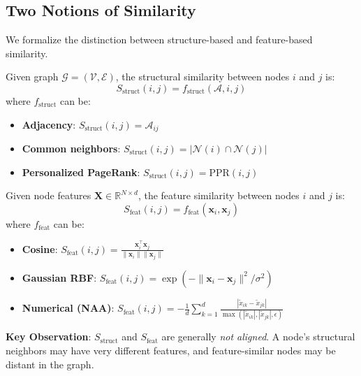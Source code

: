 \subsection{Two Notions of Similarity}

We formalize the distinction between structure-based and feature-based similarity.

\begin{definition}
\label{def:struct_sim}
Given graph $\mathcal{G} = (\mathcal{V}, \mathcal{E})$, the structural similarity between nodes $i$ and $j$ is:
\begin{equation}
S_{\text{struct}}(i, j) = f_{\text{struct}}(\mathcal{A}, i, j)
\end{equation}
where $f_{\text{struct}}$ can be:
\begin{itemize}
    \item \textbf{Adjacency}: $S_{\text{struct}}(i,j) = \mathcal{A}_{ij}$
    \item \textbf{Common neighbors}: $S_{\text{struct}}(i,j) = |\mathcal{N}(i) \cap \mathcal{N}(j)|$
    \item \textbf{Personalized PageRank}: $S_{\text{struct}}(i,j) = \text{PPR}(i,j)$
\end{itemize}
\end{definition}

\begin{definition}
\label{def:feat_sim}
Given node features $\mathbf{X} \in \mathbb{R}^{N \times d}$, the feature similarity between nodes $i$ and $j$ is:
\begin{equation}
S_{\text{feat}}(i, j) = f_{\text{feat}}(\mathbf{x}_i, \mathbf{x}_j)
\end{equation}
where $f_{\text{feat}}$ can be:
\begin{itemize}
    \item \textbf{Cosine}: $S_{\text{feat}}(i,j) = \frac{\mathbf{x}_i^\top \mathbf{x}_j}{\|\mathbf{x}_i\| \|\mathbf{x}_j\|}$
    \item \textbf{Gaussian RBF}: $S_{\text{feat}}(i,j) = \exp(-\|\mathbf{x}_i - \mathbf{x}_j\|^2 / \sigma^2)$
    \item \textbf{Numerical (NAA)}: $S_{\text{feat}}(i,j) = -\frac{1}{d}\sum_{k=1}^{d} \frac{|\tilde{x}_{ik} - \tilde{x}_{jk}|}{\max(|\tilde{x}_{ik}|, |\tilde{x}_{jk}|, \epsilon)}$
\end{itemize}
\end{definition}

\textbf{Key Observation}: $S_{\text{struct}}$ and $S_{\text{feat}}$ are generally \textit{not aligned}. A node's structural neighbors may have very different features, and feature-similar nodes may be distant in the graph.

